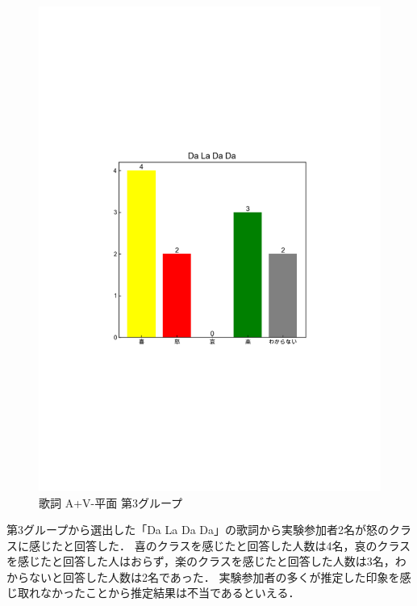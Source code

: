 \begin{figure}[H]
    \centering
    \includegraphics[width=14cm]{4318.pdf}
    \vspace{-1mm}
    \caption{歌詞 A+V-平面 第3グループ}
    \label{fig:mms}
    \vspace{5mm}
\end{figure}
第3グループから選出した「Da La Da Da」の歌詞から実験参加者2名が怒のクラスに感じたと回答した．
喜のクラスを感じたと回答した人数は4名，哀のクラスを感じたと回答した人はおらず，楽のクラスを感じたと回答した人数は3名，わからないと回答した人数は2名であった．
実験参加者の多くが推定した印象を感じ取れなかったことから推定結果は不当であるといえる．
\newpage
